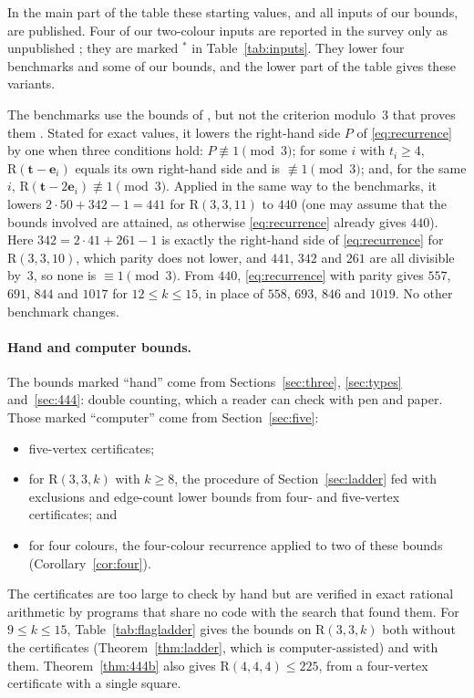 \documentclass[11pt]{article}
\theoremstyle{spacedplain}
\theoremstyle{spaceddef}
\theoremstyle{spacedremark}
\newcommand{\R}{\mathrm{R}}
\newcommand{\bt}{\mathbf{t}}
\newcommand{\e}{\mathbf{e}}
\begin{document}
In the main part of the table these starting values, and all inputs of our bounds, are published.
Four of our two-colour inputs are reported in the survey only as unpublished \cite[Table~Ib]{Rad26}; they are marked $^*$ in Table~\ref{tab:inputs}.
They lower four benchmarks and some of our bounds, and the lower part of the table gives these variants.

The benchmarks use the bounds of \cite{Boz26}, but not the criterion modulo~$3$ that proves them \cite[Theorem~2.1]{Boz26}.
Stated for exact values, it lowers the right-hand side $P$ of \eqref{eq:recurrence} by one when three conditions hold: $P\not\equiv 1\pmod 3$; for some $i$ with $t_i\ge 4$, $\R(\bt-\e_i)$ equals its own right-hand side and is $\not\equiv 1\pmod 3$; and, for the same $i$, $\R(\bt-2\e_i)\not\equiv 1\pmod 3$.
Applied in the same way to the benchmarks, it lowers $2\cdot 50+342-1=441$ for $\R(3,3,11)$ to $440$ (one may assume that the bounds involved are attained, as otherwise \eqref{eq:recurrence} already gives $440$).
Here $342=2\cdot 41+261-1$ is exactly the right-hand side of \eqref{eq:recurrence} for $\R(3,3,10)$, which parity does not lower, and $441$, $342$ and $261$ are all divisible by~$3$, so none is $\equiv 1\pmod 3$.
From $440$, \eqref{eq:recurrence} with parity gives $557$, $691$, $844$ and $1017$ for $12\le k\le 15$, in place of $558$, $693$, $846$ and $1019$.
No other benchmark changes.

\paragraph{Hand and computer bounds.}
The bounds marked ``hand'' come from Sections~\ref{sec:three}, \ref{sec:types} and~\ref{sec:444}: double counting, which a reader can check with pen and paper.
Those marked ``computer'' come from Section~\ref{sec:five}:
\begin{itemize}
\item five-vertex certificates;
\item for $\R(3,3,k)$ with $k\ge 8$, the procedure of Section~\ref{sec:ladder} fed with exclusions and edge-count lower bounds from four- and five-vertex certificates; and
\item for four colours, the four-colour recurrence applied to two of these bounds (Corollary~\ref{cor:four}).
\end{itemize}
The certificates are too large to check by hand but are verified in exact rational arithmetic by programs that share no code with the search that found them.
For $9\le k\le 15$, Table~\ref{tab:flagladder} gives the bounds on $\R(3,3,k)$ both without the certificates (Theorem~\ref{thm:ladder}, which is computer-assisted) and with them.
Theorem~\ref{thm:444b} also gives $\R(4,4,4)\le 225$, from a four-vertex certificate with a single square.
\end{document}
